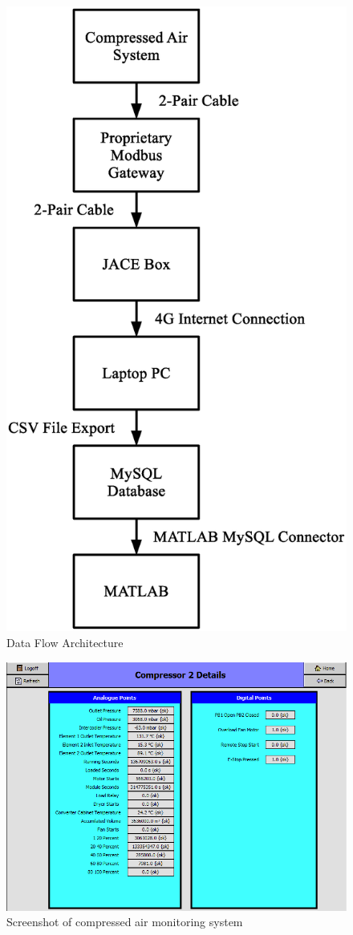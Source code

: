 \begin{figure}
\includegraphics[width = .5\columnwidth]{./Images/DataFlowArchitecture.eps}
\caption{Data Flow Architecture}
\label{fig:dataflow}
\end{figure}

\begin{figure}
\includegraphics[width = 0.9 \textwidth]{./Images/JACE_Screen.png}
\caption{Screenshot of compressed air monitoring system}
\label{fig:jacescreen}
\end{figure}


